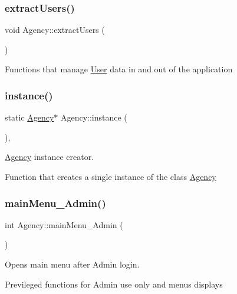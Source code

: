 \subsubsection{\texorpdfstring{extract\+Users()}{extractUsers()}}
{\footnotesize\ttfamily void Agency\+::extract\+Users (\begin{DoxyParamCaption}{ }\end{DoxyParamCaption})}

Functions that manage \hyperlink{class_user}{User} data in and out of the application \mbox{\label{group___agency_ga573fab41076b962289fad1f14031b68c}} 
\subsubsection{\texorpdfstring{instance()}{instance()}}
{\footnotesize\ttfamily static \hyperlink{class_agency}{Agency}$\ast$ Agency\+::instance (\begin{DoxyParamCaption}{ }\end{DoxyParamCaption})\hspace{0.3cm}{\ttfamily [inline]}, {\ttfamily [static]}}



\hyperlink{class_agency}{Agency} instance creator. 

Function that creates a single instance of the class \hyperlink{class_agency}{Agency} \mbox{\label{group___agency_ga1c4e64231b979f1a1bc4881ebf3e3aed}} 
\subsubsection{\texorpdfstring{main\+Menu\+\_\+\+Admin()}{mainMenu\_Admin()}}
{\footnotesize\ttfamily int Agency\+::main\+Menu\+\_\+\+Admin (\begin{DoxyParamCaption}{ }\end{DoxyParamCaption})}



Opens main menu after Admin login. 

Previleged functions for Admin use only and menus displays \mbox{\label{group___agency_gaef1bbd6021ec5639b2503d8bd8ec4244}} 

